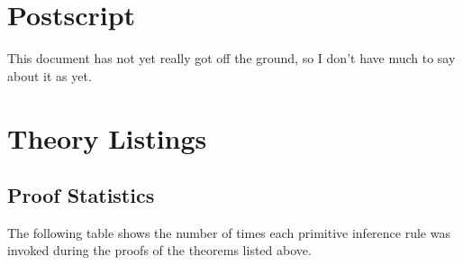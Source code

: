 
\section{Postscript}\label{POSTSCRIPT}

This document has not yet really got off the ground, so I don't have much to say about it as yet.

\pagebreak

\appendix

\section{Theory Listings}

{
\let\Section\subsection
\let\Subsection\subsubsection
\def\subsection#1{\Subsection*{#1}}

\def\section#1{\Section{#1}\label{t049a}\index{t049a}}


\pagebreak
\def\section#1{\Section{#1}\label{t049b}\index{t049b}}

}  %

\pagebreak
\subsection{Proof Statistics}

The following table shows the number of times each primitive inference rule was invoked during the proofs of the theorems listed above.

\begin{centering}
\hfill
{\underscoreoff
\begin{tabular}{| l | l |}
\hline

\end{tabular}
}%
\hfill
\end{centering}

